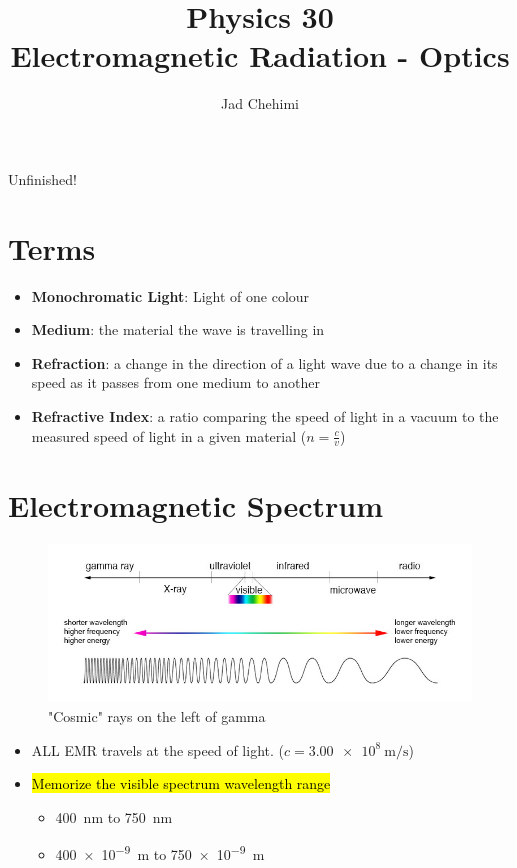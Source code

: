 \documentclass[a4paper,12pt]{article}
\title{Physics 30 \\ Electromagnetic Radiation - Optics}
\author{Jad Chehimi}
\begin{document}
\maketitle

\begin{center}
\Huge
Unfinished!
\normalsize
\end{center}

\tableofcontents

\pagebreak

\section{Terms}
\begin{itemize}
    \item{\textbf{Monochromatic Light}: Light of one colour}
    \item{\textbf{Medium}: the material the wave is travelling in}
    \item{\textbf{Refraction}: a change in the direction of a light wave due to a change in its speed as it passes from one medium to another}
    \item{\textbf{Refractive Index}: a ratio comparing the speed of light in a vacuum to the measured speed of light in a given material ($n = \frac{c}{v}$)}
\end{itemize}

\section{Electromagnetic Spectrum}
\begin{figure}[H]
    \centering
    \caption{"Cosmic" rays on the left of gamma}
    \includegraphics[width=\textwidth]{emr}
\end{figure}
\begin{itemize}
    \item{ALL EMR travels at the speed of light. ($c = \SI{3.00e8}{\m\per\s}$)}
    \item{
        \hl{Memorize the visible spectrum wavelength range}
        \begin{itemize}
            \item{\SI{400}{\nano\m} to \SI{750}{\nano\m}}
            \item{\SI{400e-9}{\m} to \SI{750e-9}{\m}}
        \end{itemize}
    }
\end{itemize}
\end{document}
